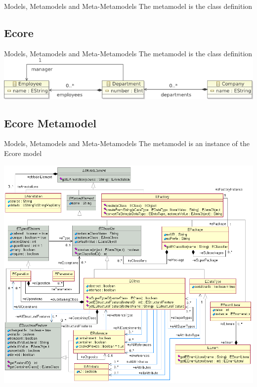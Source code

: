\documentclass[pdf, 10pt]{beamer}
\begin{document}
\begin{frame}{Models, Metamodels and Meta-Metamodels}
The metamodel is the class definition
\lstCppMetaModel

\end{frame}

\subsection{Ecore}

\begin{frame}{Models, Metamodels and Meta-Metamodels}
The metamodel is the class definition
\includegraphics[width=\textwidth]{company-metamodel.png}
\end{frame}

\subsection{Ecore Metamodel}

\begin{frame}{Models, Metamodels and Meta-Metamodels}
The metamodel is an instance of the Ecore model
\begin{center}
\includegraphics[width=\linewidth,height=0.8\textheight,keepaspectratio]{EMF/EcoreRelations.png}
\end{center}
\end{frame}
\end{document}

